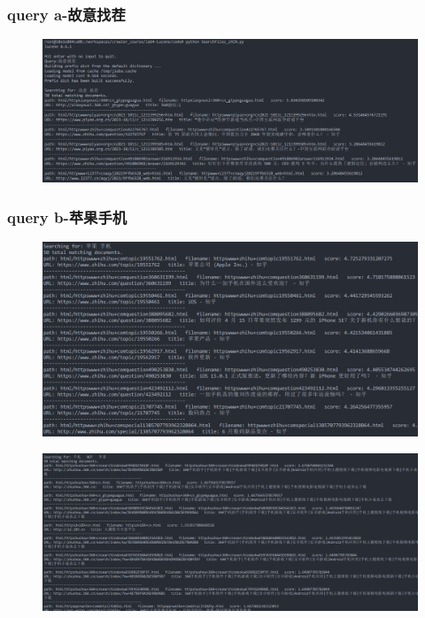 \documentclass[12pt,a4paper]{article}
\begin{document}
\subsubsection{query a-故意找茬}
\begin{figure}[H]
	\includegraphics[width=\textwidth]{query1.png}
	\centering
	
\end{figure}

\subsubsection{query b-苹果手机}
\begin{figure}[H]
	\includegraphics[width=\textwidth]{query2.png}
	\centering
\end{figure}

\begin{figure}[H]
	\includegraphics[width=\textwidth]{query3.png}
	\centering
\end{figure}
\end{document}
